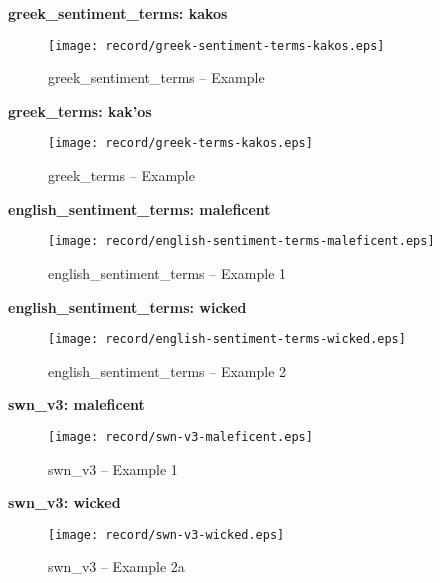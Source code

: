 \clearpage

\textbf{greek\_sentiment\_terms: \textgreek{kakos}} \\

\begin{figure}[ht]
\centering
\texttt{[image: record/greek-sentiment-terms-kakos.eps]}
\caption{greek\_sentiment\_terms -- Example}
\label{fig:gst-kakos}
\end{figure}

\clearpage

\textbf{greek\_terms: \textgreek{kak'os}} \\

\begin{figure}[ht]
\centering
\texttt{[image: record/greek-terms-kakos.eps]}
\caption{greek\_terms -- Example}
\label{fig:gt-kakos}
\end{figure}

\clearpage

\textbf{english\_sentiment\_terms: maleficent} \\

\begin{figure}[ht]
\centering
\texttt{[image: record/english-sentiment-terms-maleficent.eps]}
\caption{english\_sentiment\_terms -- Example 1}
\label{fig:est-maleficent}
\end{figure}

\clearpage

\textbf{english\_sentiment\_terms: wicked} \\

\begin{figure}[ht]
\centering
\texttt{[image: record/english-sentiment-terms-wicked.eps]}
\caption{english\_sentiment\_terms -- Example 2}
\label{fig:est-wicked}
\end{figure}

\clearpage

\textbf{swn\_v3: maleficent} \\

\begin{figure}[ht]
\centering
\texttt{[image: record/swn-v3-maleficent.eps]}
\caption{swn\_v3 -- Example 1}
\label{fig:swn-maleficent}
\end{figure}

\clearpage

\textbf{swn\_v3: wicked} \\

\begin{figure}[ht]
\centering
\texttt{[image: record/swn-v3-wicked.eps]}
\caption{swn\_v3 -- Example 2a}
\label{fig:swn-wicked}
\end{figure}

